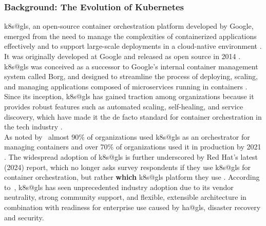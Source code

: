 \documentclass[11pt, a4paper, oneside, listof=totoc]{scrartcl}
\begin{document}
            \subsubsection{Background: The Evolution of Kubernetes}\label{subsubsec:k8sEvolution}
                \gls{k8s@gls}, an open-source \gls{container} orchestration platform developed by
                Google, emerged from the need to manage the complexities of containerized
                applications effectively and to support large-scale deployments in a cloud-native
                environment \parencites{googlecloudWhatIsKubernetes}{kubernetesOverview}.
                It was originally developed at Google and released as open source in 2014
                \parencite{googlecloudWhatIsKubernetes}.
                \gls{k8s@gls} was conceived as a successor to Google's internal \gls{container}
                management system called Borg, and designed to streamline the process of deploying,
                scaling, and managing applications composed of microservices running in containers
                \parencites[pp.~13--14]{verma2015}[p.~84]{bernstein2014}.
                Since its inception, \gls{k8s@gls} has gained traction among organizations because it
                provides robust features such as automated scaling,
                self-healing, and service discovery, which have made it the de facto standard for
                \gls{container} orchestration in the tech industry
                \parencite[pp.~855--858]{damarapati2025}.
                \\
                As noted by~\cite[p.~457]{moravcik2022} almost 90\% of organizations used
                \gls{k8s@gls} as an orchestrator for managing containers and over 70\% of organizations
                used it in production by 2021 \parencite{redhatStateOfK8sSecurityReport2021}.
                The widespread adoption of \gls{k8s@gls} is further underscored by Red Hat's latest
                (2024) report, which no longer asks survey respondents if they use \gls{k8s@gls} for
                \gls{container} orchestration, but rather \textbf{which} \gls{k8s@gls} platform they use
                \parencite[p.~27]{redhatStateOfK8sSecurityReport2024}.
                According to~\cite[pp.~855--856]{damarapati2025}, \gls{k8s@gls} has seen
                unprecedented industry adoption due to its vendor neutrality, strong community
                support, and flexible, extensible architecture in combination with readiness for
                enterprise use caused by \gls{ha@gls}, disaster recovery and security.
\end{document}
